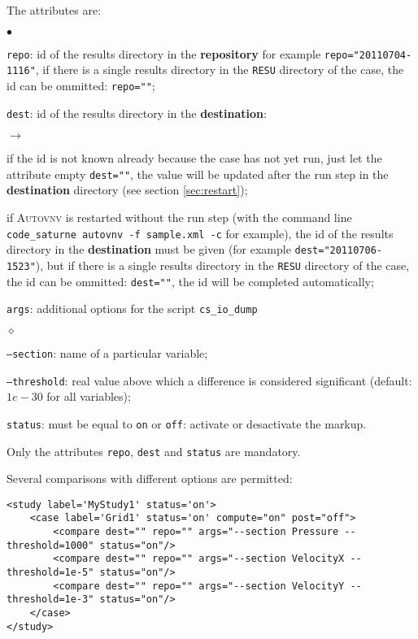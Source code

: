 \documentclass[a4paper,10pt,twoside]{csshortdoc}
\begin{document}
The attributes are:
\begin{list}{$\bullet$}{}

\item \texttt{repo}: id of the results directory in the \textbf{repository} for
example \texttt{repo="20110704-1116"}, if there is a single results directory
in the \texttt{RESU} directory of the case, the id can be ommitted:
\texttt{repo=""};

\item \texttt{dest}: id of the results directory in the \textbf{destination}:
\begin{list}{$\rightarrow$}{}
\item if the id is not known already because the case has not yet run, just let
the attribute empty \texttt{dest=""}, the value will be updated after the run
step in the \textbf{destination} directory (see section \ref{sec:restart});
\item if \textsc{Autovnv} is restarted without the run step (with the command
line \texttt{code\_saturne autovnv -f sample.xml -c} for example), the id of
the results directory in the \textbf{destination} must be given (for example
\texttt{dest="20110706-1523"}), but if there is a single results directory in
the \texttt{RESU} directory of the case, the id can be ommitted:
\texttt{dest=""}, the id will be completed automatically;
\end{list}

\item \texttt{args}: additional options for the script \texttt{cs\_io\_dump}
\begin{list}{$\diamond$}{}
\item \texttt{--section}: name of a particular variable;
\item \texttt{--threshold}: real value above which a difference is considered
significant (default: $1e-30$ for all variables);
\end{list}
\item \texttt{status}: must be equal to \texttt{on} or \texttt{off}:
activate or desactivate the markup.
\end{list}

Only the attributes \texttt{repo}, \texttt{dest} and \texttt{status} are mandatory.

Several comparisons with different options are permitted:
\small
\begin{verbatim}
<study label='MyStudy1' status='on'>
    <case label='Grid1' status='on' compute="on" post="off">
        <compare dest="" repo="" args="--section Pressure --threshold=1000" status="on"/>
        <compare dest="" repo="" args="--section VelocityX --threshold=1e-5" status="on"/>
        <compare dest="" repo="" args="--section VelocityY --threshold=1e-3" status="on"/>
    </case>
</study>
\end{verbatim}
\normalsize
\end{document}
